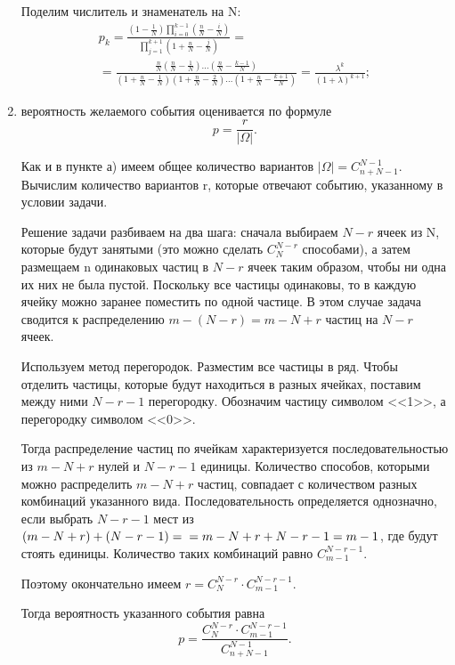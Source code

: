 \begin{enumerate}[label=\alph*)]
Поделим числитель и знаменатель на N:
\begin{equation*}
\begin{split}
p_k =
\frac{ \left( 1- \frac{1}{N} \right) \prod \limits_{i=0}^{k-1} \left( \frac{n}{N} - \frac{i}{N} \right) }{ \prod \limits_{j=1}^{k+1} \left( 1+ \frac{n}{N} - \frac{j}{N} \right) } = \\
= \frac{ \frac{n}{N} \left( \frac{n}{N} - \frac{1}{N} \right) \dotsc \left( \frac{n}{N} - \frac{k-1}{N} \right) }{ \left( 1+ \frac{n}{N} - \frac{1}{N} \right) \left( 1+ \frac{n}{N} - \frac{2}{N} \right) \dotsc \left( 1+ \frac{n}{N} - \frac{k+1}{N} \right) } =
\frac{ \lambda^k}{ \left( 1+ \lambda \right)^{k+1}};
\end{split}
\end{equation*}

\item вероятность желаемого события оценивается по формуле
$$ p =
\frac{r}{| \Omega |}.$$

Как и в пункте а) имеем общее количество вариантов $ | \Omega | = C_{n+N-1}^{N-1} $.
Вычислим количество вариантов r, которые отвечают событию, указанному в условии задачи.

Решение задачи разбиваем на два шага:
сначала выбираем $ N - r $ ячеек из N, которые будут занятыми (это можно сделать $ C_{N}^{N-r} $ способами),
а затем размещаем n одинаковых частиц в $ N - r $ ячеек таким образом, чтобы ни одна их них не была пустой.
Поскольку все частицы одинаковы, то в каждую ячейку можно заранее поместить по одной частице.
В этом случае задача сводится к распределению $ m - \left( N - r \right) = m - N + r $ частиц на $ N - r $ ячеек.

Используем метод перегородок.
Разместим все частицы в ряд.
Чтобы отделить частицы, которые будут находиться в разных ячейках, поставим между ними $ N - r - 1 $ перегородку.
Обозначим частицу символом <<1>>, а перегородку символом <<0>>.

Тогда распределение частиц по ячейкам характеризуется последовательностью из $ m - N + r $ нулей и $ N - r - 1 $ единицы.
Количество способов, которыми можно распределить $ m - N + r $ частиц, совпадает с количеством разных комбинаций указанного вида.
Последовательность определяется однозначно, если выбрать $ N - r - 1 $ мест из
$ \left( m - N + r \right) + \left( N - r - 1 \right) = \\
= m - N + r + N - r - 1 = m - 1 $,
где будут стоять единицы.
Количество таких комбинаций равно $ C_{m-1}^{N - r - 1} $.

Поэтому окончательно имеем $ r = C_{N}^{N-r} \cdot C_{m-1}^{N - r - 1} $.

Тогда вероятность указанного события равна
$$ p =
\frac{C_{N}^{N-r} \cdot C_{m-1}^{N - r - 1}}{C_{n+N-1}^{N-1}}.$$
\end{enumerate}
